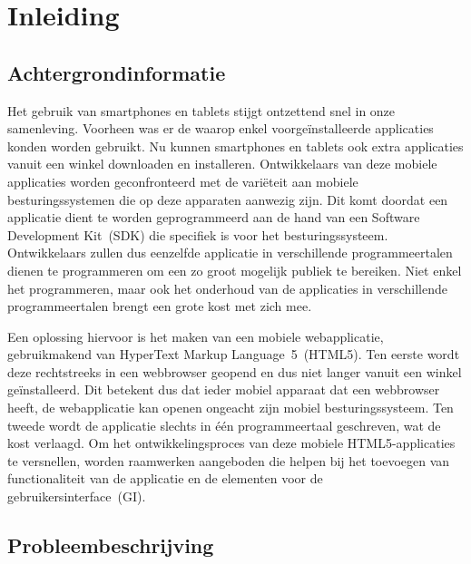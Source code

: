 \chapter{Inleiding} 
\label{inleiding}

\section{Achtergrondinformatie}

Het gebruik van smartphones en tablets stijgt ontzettend snel in onze samenleving.
Voorheen was er de  waarop enkel voorgeïnstalleerde applicaties konden worden gebruikt.
Nu kunnen smartphones en tablets ook extra applicaties vanuit een winkel downloaden en installeren.
Ontwikkelaars van deze mobiele applicaties worden geconfronteerd met de variëteit aan mobiele besturingssystemen die op deze apparaten aanwezig zijn.
Dit komt doordat een applicatie dient te worden geprogrammeerd aan de hand van een Software Development Kit~(SDK) die specifiek is voor het besturingssysteem.
Ontwikkelaars zullen dus eenzelfde applicatie in verschillende programmeertalen dienen te programmeren om een zo groot mogelijk publiek te bereiken.
Niet enkel het programmeren, maar ook het onderhoud van de applicaties in verschillende programmeertalen brengt een grote kost met zich mee.

Een oplossing hiervoor is het maken van een mobiele webapplicatie, gebruikmakend van HyperText Markup Language~5~(HTML5).
Ten eerste wordt deze rechtstreeks in een webbrowser geopend en dus niet langer vanuit een winkel geïnstalleerd.
Dit betekent dus dat ieder mobiel apparaat dat een webbrowser heeft, de webapplicatie kan openen ongeacht zijn mobiel besturingssysteem.
Ten tweede wordt de applicatie slechts in één programmeertaal geschreven, wat de kost verlaagd.
Om het ontwikkelingsproces van deze mobiele HTML5-applicaties te versnellen, worden raamwerken aangeboden die helpen bij het toevoegen van functionaliteit van de applicatie en de elementen voor de gebruikersinterface~(GI). 

\section{Probleembeschrijving}

